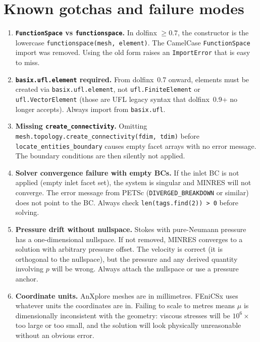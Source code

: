 \documentclass[11pt]{article}
\begin{document}
\section{Known gotchas and failure modes}

\begin{enumerate}[noitemsep]

\item \textbf{\texttt{FunctionSpace} vs \texttt{functionspace}.}
  In dolfinx $\geq 0.7$, the constructor is the lowercase
  \texttt{functionspace(mesh, element)}. The CamelCase
  \texttt{FunctionSpace} import was removed. Using the old form raises
  an \texttt{ImportError} that is easy to miss.

\item \textbf{\texttt{basix.ufl.element} required.}
  From dolfinx~0.7 onward, elements must be created via
  \texttt{basix.ufl.element}, not \texttt{ufl.FiniteElement} or
  \texttt{ufl.VectorElement} (those are UFL legacy syntax that
  dolfinx~0.9+ no longer accepts). Always import from \texttt{basix.ufl}.

\item \textbf{Missing \texttt{create\_connectivity}.}
  Omitting \texttt{mesh.topology.create\_connectivity(fdim, tdim)}
  before \texttt{locate\_entities\_boundary} causes empty facet arrays
  with no error message. The boundary conditions are then silently
  not applied.

\item \textbf{Solver convergence failure with empty BCs.}
  If the inlet BC is not applied (empty inlet facet set), the system
  is singular and MINRES will not converge. The error message from
  PETSc (\texttt{DIVERGED\_BREAKDOWN} or similar) does not point to
  the BC. Always check \texttt{len(tags.find(2)) > 0} before solving.

\item \textbf{Pressure drift without nullspace.}
  Stokes with pure-Neumann pressure has a one-dimensional nullspace.
  If not removed, MINRES converges to a solution with arbitrary pressure
  offset. The velocity is correct (it is orthogonal to the nullspace),
  but the pressure and any derived quantity involving $p$ will be wrong.
  Always attach the nullspace or use a pressure anchor.

\item \textbf{Coordinate units.}
  AnXplore meshes are in millimetres. FEniCSx uses whatever units the
  coordinates are in. Failing to scale to metres means $\mu$ is
  dimensionally inconsistent with the geometry: viscous stresses will be
  $10^6\times$ too large or too small, and the solution will look
  physically unreasonable without an obvious error.


\end{enumerate}
\end{document}
